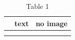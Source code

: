 \documentclass[11pt,a4paper]{article}
\begin{document}
\begin{table}[h]
\caption{Table 1}
\begin{tabular}{|l|l|l|}
\hline
 & text   %
 & no image \\ \hline
 &  &  \\ \hline
 &  &  \\ \hline
\end{tabular}
\end{table}
\end{document}
